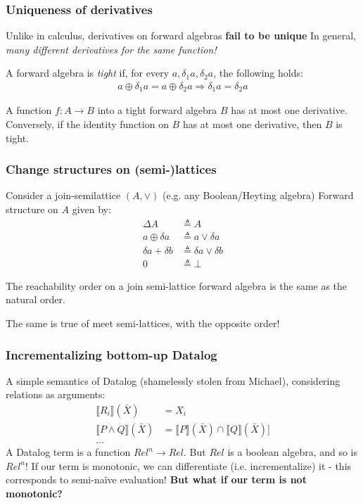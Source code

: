 \documentclass[english]{beamer}
\theoremstyle{plain}
\theoremstyle{remark}
\theoremstyle{remark}
\theoremstyle{remark}
\theoremstyle{definition}
\theoremstyle{definition}
\newcommand{\ra}[0]{\rightarrow}
\newcommand{\defeq}[0]{\triangleq}
\begin{document}
\begin{frame}
  \frametitle{Uniqueness of derivatives}
  Unlike in calculus, derivatives on forward algebras \textbf{fail to be unique}
  \vfill
  In general, \textit{many different derivatives for the same function!}
  \vfill
  \begin{definition}
    A forward algebra is \textit{tight} if, for every $a, \delta_1 a, \delta_2 a$, the following
    holds:
    \begin{align*}
      a \oplus \delta_1 a = a \oplus \delta_2 a \Rightarrow \delta_1 a = \delta_2 a
    \end{align*}
  \end{definition}

  \begin{lemma}
    A function $f : A \ra B$ into a tight forward algebra $B$ has at most one derivative.
    Conversely, if the identity function on $B$ has at most one derivative, then $B$ is tight.
  \end{lemma}
  
\end{frame}

\begin{frame}
  \frametitle{Change structures on (semi-)lattices}
  Consider a join-semilattice $(A, \vee)$ (e.g. any Boolean/Heyting algebra)
  \vfill
  Forward structure on $A$ given by:
  \begin{align*}
    \Delta A &\defeq A\\
    a \oplus \delta a &\defeq a \vee \delta a\\
    \delta a + \delta b &\defeq \delta a \vee \delta b\\
    0 &\defeq \bot
  \end{align*}
  \begin{lemma}
    The reachability order on a join semi-lattice forward algebra is the same as the
    natural order.
  \end{lemma}
  The same is true of meet semi-lattices, with the opposite order!
\end{frame}

\newcommand{\sem}[1]{\llbracket #1 \rrbracket}
\begin{frame}
  \frametitle{Incrementalizing bottom-up Datalog}
  A simple semantics of Datalog (shamelessly stolen from Michael), considering relations as
  arguments:
  \begin{align*}
    \sem{R_i}(\bar{X}) &= X_i\\
    \sem{P \wedge Q}(\bar{X}) &= \sem{P}(\bar{X}) \cap \sem{Q}(\bar{X})]\\
      \ldots
  \end{align*}
  A Datalog term is a function $\mathit{Rel}^n \ra \mathit{Rel}$.
  \vfill
  But $\mathit{Rel}$ is a boolean algebra, and so is $\mathit{Rel}^n$!
  \vfill
  If our term is monotonic, we can differentiate (i.e. incrementalize) it - this corresponds
  to semi-na\"ive evaluation!
  \vfill
  \textbf{But what if our term is not monotonic?}
\end{frame}
\end{document}
